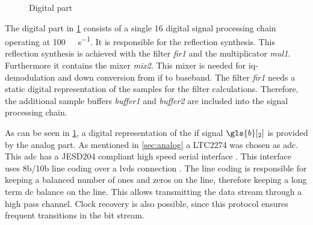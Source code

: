 \documentclass[12pt,a4paper,parskip=full,abstract=true,BCOR=12mm,twoside,open=right]{scrreprt}
\def\device#1{\textit{#1}}
\begin{document}
\begin{figure}[htb]
    \caption{Digital part}
    \label{fig:digital}
\end{figure}

The digital part in \cref{fig:digital} consists of a single \SI{16}{\bit} digital signal processing
chain operating at \SI{100}{\mega\samples\per\second}. It is responsible
for the reflection synthesis. This reflection synthesis is achieved with
the filter \device{fir1} and the multiplicator \device{mul1}. Furthermore
it contains the mixer \device{mix2}. This mixer is needed for \gls{iq}-demodulation
and down conversion from \gls{if} to baseband. The filter \device{fir1}
needs a static digital representation of the samples for the filter calculations.
Therefore, the additional sample buffers \device{buffer1} and \device{buffer2} are
included into the signal processing chain.

As can be seen in \cref{fig:digital}, a digital representation of the \gls{if}
signal $\gls{b}[_2]$ is provided by the analog part. As mentioned in \cref{sec:analog}
a LTC2274 was chosen as \gls{adc}. This \gls{adc} has a
JESD204 compliant high speed serial interface \cite{ltc2274}. This interface uses 8b/10b
line coding over a \gls{lvds} connection \cite{jesd205B.01}. The line coding
is responsible for keeping a balanced number of ones and zeros on the line, therefore keeping a long term
\gls{dc} balance on the line. This allows transmitting the data stream through a high pass
channel. Clock recovery is also possible, since this protocol ensures frequent transitions
in the bit stream.
\end{document}
